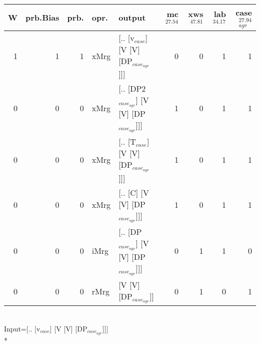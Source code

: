 \begin{tabularx}{\linewidth}{rrrlXrrrr}
\hline
   W &   prb.Bias &   prb. & opr.   & output                                    &   mc$^{27.54}$ &   xws$^{47.81}$ &   lab$^{34.17}$ &   case$_{agr}^{27.94}$ \\
\hline
   1 &       1 &   1 & xMrg & [.. [v$_{case}$] [V [V] [DP$_{case_{agr}}$]]]       &            0 &             0 &             1 &                  1 \\
   0 &       0 &   0 & xMrg & [.. [DP2$_{case_{agr}}$] [V [V] [DP$_{case_{agr}}$]]] &            1 &             0 &             1 &                  1 \\
   0 &       0 &   0 & xMrg & [.. [T$_{case}$] [V [V] [DP$_{case_{agr}}$]]]       &            1 &             0 &             1 &                  1 \\
   0 &       0 &   0 & xMrg & [.. [C] [V [V] [DP$_{case_{agr}}$]]]            &            1 &             0 &             1 &                  1 \\
   0 &       0 &   0 & iMrg & [.. [DP$_{case_{agr}}$] [V [V] [DP$_{case_{agr}}$]]]  &            0 &             1 &             1 &                  0 \\
   0 &       0 &   0 & rMrg & [V [V] [DP$_{case_{agr}}$]]                     &            0 &             1 &             0 &                  1 \\
\hline
\end{tabularx}\endgroup\\
\begingroup\scriptsize Input=[.. [v$_{case}$] [V [V] [DP$_{case_{agr}}$]]]\\*

